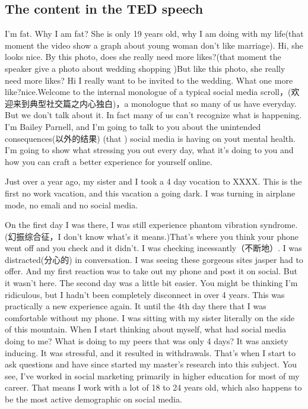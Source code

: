 \documentclass[UTF8,12pt,a4paper]{article}
\theoremstyle{Problem}
\theoremstyle{Solution}
\begin{document}
\begin{appendix}
    \section{The content in the TED speech}
    I'm fat. Why I am fat? She is only 19 years old, why I am doing with my life(that moment the video show a graph about young woman don't like marriage). Hi, she looks nice. By this photo, does she really need more likes?(that moment the speaker give a photo about wedding shopping )But like this photo, she really need more likes? Hi I really want to be invited to the wedding. What one more like?nice.Welcome to the internal monologue of a typical social media scroll，(欢迎来到典型社交篇之内心独白)，a monologue that so many of us have everyday. But we don't talk about it. In fact many of us can't recognize what is happening. I'm Bailey Parnell, and I'm going to talk to you about the unintended consequences(以外的结果) (that ) social media is having on yout mental health. I'm going to show what stressing you out every day, what it's doing to you and how you can craft a better experience for yourself online. 

    Just over a year ago, my sister and I took a 4 day vocation to XXXX. This is the first no work vacation, and this vacation a going dark. I was turning in airplane mode, no emali and no  social media. 
    
    On the first day I was there, I was still experience phantom vibration syndrome.(幻振综合征，I don't know what's it means.)That's where you think your phone went off and you check and it didn't. I was checking incessantly（不断地）. I was distracted(分心的) in conversation. I was seeing these gorgeous sites jasper had to offer. And my first reaction was to take out my phone and post it on social. But it wasn't here. The second day was a little bit easier. You might be thinking I'm ridiculous, but I hadn't been completely disconnect in over 4 years. This was practically a new experience again. It until the 4th day there that I was comfortable without my phone. I was sitting with my sister literally on the side of this mountain. When I start thinking about myself, what had social media doing to me? What is doing to my peers that was only 4 days? It was anxiety inducing. It was stressful, and it resulted in withdrawals. That's when I start to ask questions and have since started my master's research into this subject. You see, I've worked in social marketing primarily in higher education for most of my career. That means I work with a lot of 18 to 24 years old, which also happens to be the most active demographic on social media.
    

\end{appendix}
\end{document}
